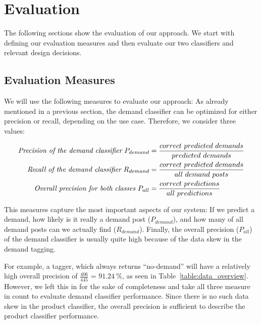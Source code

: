 
\section{Evaluation}
\label{sec:evaluation}


The following sections show the evaluation of our approach.
We start with defining our evaluation measures and then evaluate our two classifiers and relevant design decisions.

\subsection{Evaluation Measures}
\label{sub:evaluation_measures}
We will use the following measures to evaluate our approach:
As already mentioned in a previous section, the demand classifier can be optimized for either precision or recall, depending on the use case.
Therefore, we consider three values:

\begin{align*}
	\emph{Precision of the demand classifier}~P_{demand} 			&= \frac{correct~predicted~demands}{predicted~demands} \\
	\emph{Recall of the demand classifier}~R_{demand} 				&= \frac{correct~predicted~demands}{all~demand~posts} \\
	\emph{Overall precision for both classes}~P_{all} &= \frac{correct~predictions}{all~predictions} \\
\end{align*}

This measures capture the most important aspects of our system: If we predict a demand, how likely is it really a demand post ($P_{demand}$), and how many of all demand posts can we actually find ($R_{demand}$).
Finally, the overall precision ($P_{all}$) of the demand classifier is usually quite high because of the data skew in the demand tagging.

For example, a tagger, which always returns ``no-demand'' will have a relatively high overall precision of $\frac{406}{445}$ = $91.24~\%$, as seen in Table~\ref{table:data_overview}.
However, we left this in for the sake of completeness and take all three measure in count to evaluate demand classifier performance.
Since there is no such data skew in the product classifier, the overall precision is sufficient to describe the product classifier performance.

